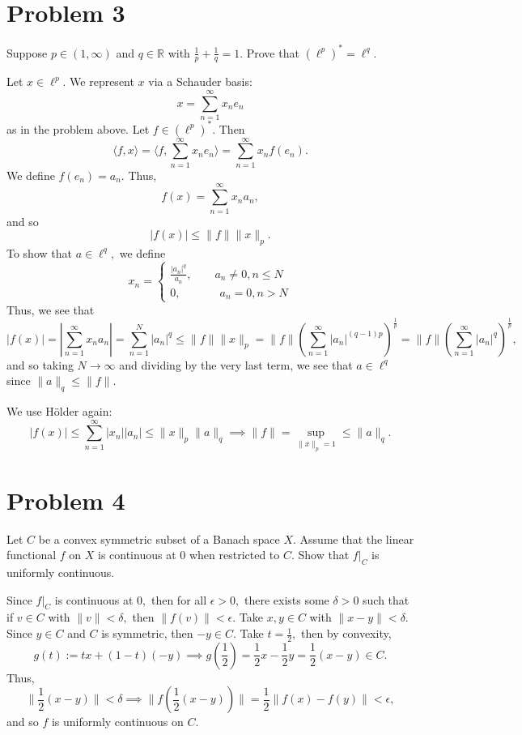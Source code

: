 \documentclass[11pt]{article}
\newcommand{\bbR}{\mathbb{R}}
\begin{document}
\section*{Problem 3}
\begin{problem}
    Suppose $p\in (1, \infty)$ and $q\in \bbR$ with $\frac{1}{p} + \frac{1}{q} = 1.$ Prove that $(\ell^p)^* = \ell^q.$
\end{problem}
\begin{solution}
    Let $x\in \ell^p.$ We represent $x$ via a Schauder basis:
    \[x = \sum_{n=1}^\infty x_n e_n\] as in the problem above. Let $f\in (\ell^p)^*.$ Then
    \[\langle f, x\rangle = \langle f, \sum_{n=1}^\infty x_n e_n \rangle = \sum_{n=1}^\infty x_n f(e_n).\] We define $f(e_n)= a_n.$ Thus, 
    \[f(x) = \sum_{n=1}^\infty x_na_n,\] and so 
    \[|f(x)|\leq \|f\|\|x\|_p.\] To show that $a\in \ell^q,$ we define 
    \[x_n = 
    \begin{cases}
    \frac{|a_n|^q}{a_n}, \qquad a_n \neq 0, n\leq N\\
    0, \qquad \quad \: \: a_n = 0, n> N
    \end{cases}\]
    Thus, we see that 
    \[|f(x)| = \left|\sum_{n=1}^\infty x_na_n\right| = \sum_{n=1}^N |a_n|^q\leq \|f\|\|x\|_p= \|f\|\left(\sum_{n=1}^\infty|a_n|^{(q-1)p}\right)^\frac{1}{p} = \|f\| \left(\sum_{n=1}^\infty |a_n|^q\right)^\frac{1}{p},\] and so taking $N\to \infty$ and dividing by the very last term, we see that $a\in \ell^q$ since $\|a\|_q \leq \|f\|.$ 

    We use H\"older again:
    \[|f(x)| \leq \sum_{n=1}^\infty |x_n| |a_n| \leq \|x\|_p \|a\|_q \implies \|f\| = \sup_{\|x\|_p = 1} \leq \|a\|_q.\]
\end{solution}

\newpage
\section*{Problem 4}
\begin{problem}
    Let $C$ be a convex symmetric subset of a Banach space $X.$ Assume that the linear functional $f$ on $X$ is continuous at $0$ when restricted to $C.$ Show that $f|_C$ is uniformly continuous.
\end{problem}
\begin{solution}
    Since $f|_C$ is continuous at $0,$ then for all $\epsilon>0,$ there exists some $\delta>0$ such that if $v\in C$ with $\|v\|< \delta,$ then $\|f(v)\|< \epsilon.$ Take $x,y \in C$ with $\|x-y\|< \delta.$ Since $y \in C$ and $C$ is symmetric, then $-y \in C.$ Take $t = \frac{1}{2},$ then by convexity,
    \[g(t) := tx + (1-t)(-y) \implies g(\frac{1}{2}) = \frac{1}{2}x - \frac{1}{2}y = \frac{1}{2}(x-y)\in C.\] Thus, 
    \[\|\frac{1}{2}(x-y)\| < \delta \implies \|f(\frac{1}{2}(x-y))\| = \frac{1}{2}\|f(x) - f(y)\|< \epsilon,\] and so $f$ is uniformly continuous on $C.$
\end{solution}
\end{document}
